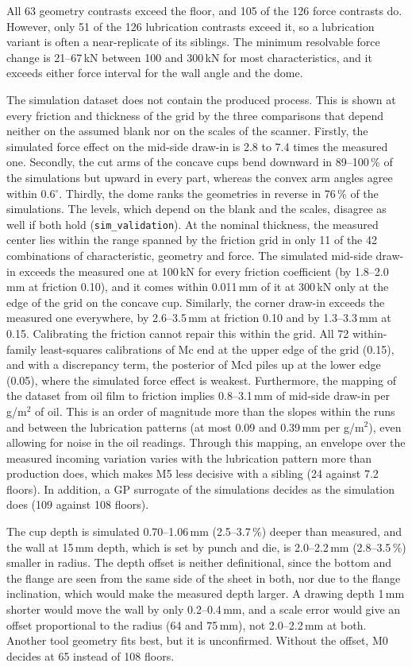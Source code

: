 \documentclass[pdflatex,sn-basic,lineno]{sn-jnl}
\newcommand{\res}[1]{\texttt{#1}}  %
\begin{document}
All 63 geometry contrasts exceed the floor, and 105 of the 126 force contrasts do. However, only 51 of the 126 lubrication contrasts exceed it, so a lubrication variant is often a near-replicate of its siblings. The minimum resolvable force change is 21--67\,kN between 100 and 300\,kN for most characteristics, and it exceeds either force interval for the wall angle and the dome.

The simulation dataset does not contain the produced process. This is shown at every friction and thickness of the grid by the three comparisons that depend neither on the assumed blank nor on the scales of the scanner. Firstly, the simulated force effect on the mid-side draw-in is 2.8 to 7.4 times the measured one. Secondly, the cut arms of the concave cups bend downward in 89--100\,\% of the simulations but upward in every part, whereas the convex arm angles agree within 0.6$^\circ$. Thirdly, the dome ranks the geometries in reverse in 76\,\% of the simulations. The levels, which depend on the blank and the scales, disagree as well if both hold (\res{sim\_validation}). At the nominal thickness, the measured center lies within the range spanned by the friction grid in only 11 of the 42 combinations of characteristic, geometry and force. The simulated mid-side draw-in exceeds the measured one at 100\,kN for every friction coefficient (by 1.8--2.0\,mm at friction 0.10), and it comes within 0.011\,mm of it at 300\,kN only at the edge of the grid on the concave cup. Similarly, the corner draw-in exceeds the measured one everywhere, by 2.6--3.5\,mm at friction 0.10 and by 1.3--3.3\,mm at 0.15. Calibrating the friction cannot repair this within the grid. All 72 within-family least-squares calibrations of Mc end at the upper edge of the grid (0.15), and with a discrepancy term, the posterior of Mcd piles up at the lower edge (0.05), where the simulated force effect is weakest. Furthermore, the mapping of the dataset from oil film to friction implies 0.8--3.1\,mm of mid-side draw-in per g/m$^2$ of oil. This is an order of magnitude more than the slopes within the runs and between the lubrication patterns (at most 0.09 and 0.39\,mm per g/m$^2$), even allowing for noise in the oil readings. Through this mapping, an envelope over the measured incoming variation varies with the lubrication pattern more than production does, which makes M5 less decisive with a sibling (24 against 7.2 floors). In addition, a GP surrogate of the simulations decides as the simulation does (109 against 108 floors).

The cup depth is simulated 0.70--1.06\,mm (2.5--3.7\,\%) deeper than measured, and the wall at 15\,mm depth, which is set by punch and die, is 2.0--2.2\,mm (2.8--3.5\,\%) smaller in radius. The depth offset is neither definitional, since the bottom and the flange are seen from the same side of the sheet in both, nor due to the flange inclination, which would make the measured depth larger. A drawing depth 1\,mm shorter would move the wall by only 0.2--0.4\,mm, and a scale error would give an offset proportional to the radius (64 and 75\,mm), not 2.0--2.2\,mm at both. Another tool geometry fits best, but it is unconfirmed. Without the offset, M0 decides at 65 instead of 108 floors.
\end{document}
